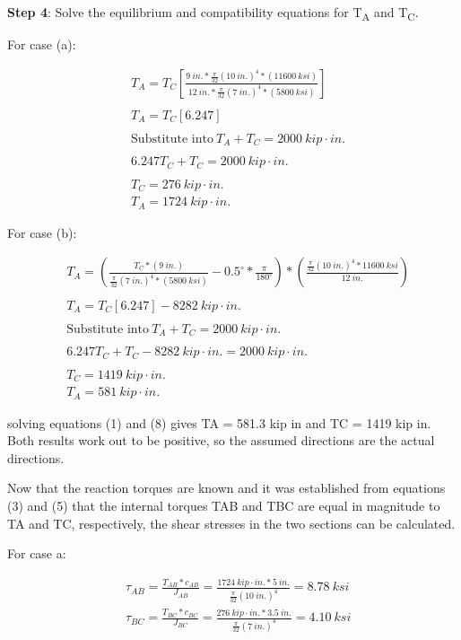 \documentclass[
  letterpaper,
  DIV=11,
  numbers=noendperiod]{scrreprt}
\theoremstyle{definition}
\theoremstyle{remark}
\begin{document}
\begin{tcolorbox}
\begin{tcolorbox}
\textbf{Step 4}: Solve the equilibrium and compatibility equations for
T\textsubscript{A} and T\textsubscript{C}.

For case (a):

\[
\begin{aligned}
&T_A=T_C\left[\frac{9{~in.}*\frac{\pi}{32}(10{~in.})^4*(11600{~ksi})}{12{~in.}*\frac{\pi}{32}(7{~in.})^4*(5800{~ksi})}\right] \\
\\
&T_A=T_C[6.247] \\
\\
&\text{Substitute into}~T_A+T_C=2000{~kip}\cdot{in.} \\
\\
&6.247T_C+T_C=2000{~kip}\cdot{in.} \\
\\
&T_C=276{~kip}\cdot{in.} \\
&T_A=1724{~kip}\cdot{in.}
\end{aligned}
\]

For case (b):

\[
\begin{aligned}
&T_A=\left(\frac{T_C*(9{~in.})}{\frac{\pi}{32}(7{~in.})^4*(5800{~ksi})}-0.5^\circ*\frac{\pi}{180^\circ}\right)*\left(\frac{\frac{\pi}{32}(10{~in.})^4*11600{~ksi}}{12~in.}\right) \\
\\
&T_A=T_C[6.247]-8282{~kip}\cdot{in.} \\
\\
&\text{Substitute into}~T_A+T_C=2000{~kip}\cdot{in.} \\
\\
&6.247T_C+T_C-8282{~kip}\cdot{in.}=2000{~kip}\cdot{in.} \\
\\
&T_C=1419{~kip}\cdot{in.} \\
&T_A=581{~kip}\cdot{in.}
\end{aligned}
\]

solving equations (1) and (8) gives TA = 581.3 kip in and TC = 1419 kip
in. Both results work out to be positive, so the assumed directions are
the actual directions.

Now that the reaction torques are known and it was established from
equations (3) and (5) that the internal torques TAB and TBC are equal in
magnitude to TA and TC, respectively, the shear stresses in the two
sections can be calculated.

For case a:

\[
\begin{aligned}
& \tau_{AB}=\frac{T_{AB}*c_{AB}}{J_{AB}}=\frac{1724{~kip}\cdot{in.}*5{~in.}}{\frac{\pi}{32}(10{~in.})^4}=8.78{~ksi} \\
& \tau_{BC}=\frac{T_{BC}*c_{BC}}{J_{BC}}=\frac{276{~kip}\cdot{in.}*3.5{~in.}}{\frac{\pi}{32}(7{~in.})^4}=4.10{~ksi}
\end{aligned}
\]


\end{tcolorbox}
\end{tcolorbox}
\end{document}
